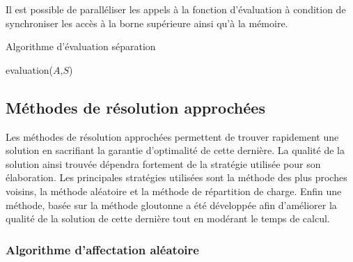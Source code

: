 Il est possible de paralléliser les appels à la fonction d'évaluation à condition de synchroniser les accès à la borne supérieure ainsi qu'à la mémoire.


\begin{algorithm}[H]
\caption{Algorithme d'évaluation séparation}
\label{algo:BranchAndBound}
\end{algorithm}

\begin{function}[H]
\caption{evaluation($A$,$S$)}
\label{algo:func:evaluationBranchAndBound}
\end{function}

\subsection{Méthodes de résolution approchées}\label{chapitre:ordo:sec:resolution:subsection:heuristiques}

Les méthodes de résolution approchées permettent de trouver rapidement une solution en sacrifiant la garantie d'optimalité de cette dernière. La qualité de la solution ainsi trouvée dépendra fortement de la stratégie utilisée pour son élaboration. Les principales stratégies utilisées sont la méthode des plus proches voisins, la méthode aléatoire et la méthode de répartition de charge. Enfin une méthode, basée sur la méthode gloutonne a été développée afin d'améliorer la qualité de la solution de cette dernière tout en modérant le temps de calcul.

\subsubsection{Algorithme d'affectation aléatoire}\label{chap:ordo:reso:random}

